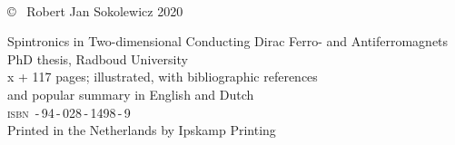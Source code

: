 \frenchspacing
\raggedbottom

\thispagestyle{empty}
\vspace*{4em}
\begin{center}
\huge{}\\
\end{center}
\newpage

\thispagestyle{empty}
\null
\vfill

\setlength{\marginparwidth}{2em}
\setlength{\marginparsep}{0.75em}

\noindent \copyright~ Robert Jan Sokolewicz 2020


\noindent Spintronics in Two-dimensional Conducting Dirac Ferro- and Antiferromagnets\\
PhD thesis, Radboud University\\
x + 117 pages; illustrated, with bibliographic references \\ and popular summary in English and Dutch\\[2ex]
{\scshape isbn} \,-\,94\,-\,028\,-\,1498\,-\,9\\[2ex]
Printed in the Netherlands by Ipskamp Printing\\[2ex]


